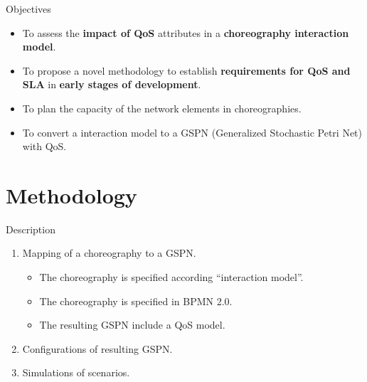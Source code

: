 \documentclass[xcolor=svgnames]{beamer}
\begin{document}
    \begin{frame}
        \begin{block}{Objectives }\vspace{-.3\baselineskip}
        	\begin{itemize}
                  \item To assess the \textbf{impact of QoS} attributes in a \textbf{choreography interaction model}.
		  \item To propose a novel methodology to establish \textbf{requirements for QoS and SLA} in \textbf{early stages of development}.
		  \item To plan the capacity of the network elements in choreographies.
		  \item To convert a interaction model to a GSPN (Generalized Stochastic Petri Net) with QoS.
            \end{itemize}
        \end{block}
    \end{frame}

    

\section{Methodology}
  \begin{frame}{Description}
    \begin{enumerate}
      \item <1-> Mapping of a choreography to a GSPN.
	  \begin{itemize}
	    \item The choreography is specified according ``interaction model''.
	    \item The choreography is specified in BPMN 2.0.
	    \item The resulting GSPN include a QoS model.
	  \end{itemize}

      \item <2-> Configurations of resulting GSPN. 
      \item <3-> Simulations of scenarios.
    \end{enumerate}

  \end{frame}
\end{document}

